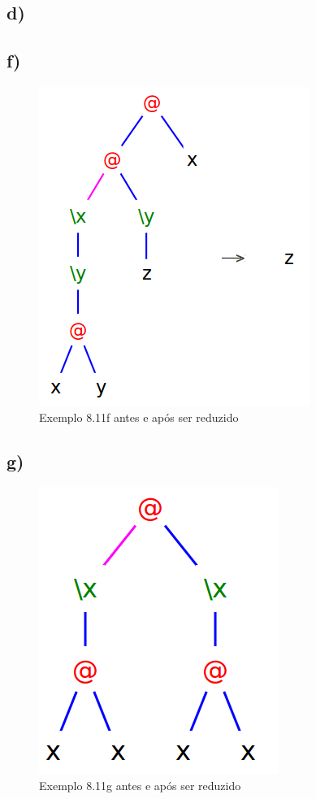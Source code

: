 \documentclass[a4paper]{article}
\begin{document}
\FloatBarrier

\subsection*{d)}


\FloatBarrier

\subsection*{f)}

\begin{figure}[h]
  \centering
  \includegraphics[scale=0.5]{8-11f.png}
  \caption{Exemplo 8.11f antes e após ser reduzido}
\end{figure}

\FloatBarrier

\subsection*{g)}

\begin{figure}[h]
  \centering
  \includegraphics[scale=0.4]{8-11g.png}
  \caption{Exemplo 8.11g antes e após ser reduzido}
\end{figure}
\end{document}
